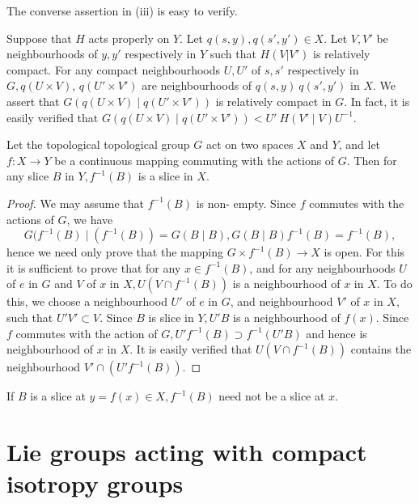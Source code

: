 The converse assertion in  (iii) is easy to  verify. 

\medskip
{}
  Suppose that  $ H $  acts properly on $ Y $. Let $ q ( s,y ), q (
  s',y' ) \in  X $. Let $ V, V' $ be neighbourhoods of  $ y,y'$
  respectively  in $ Y$ such that  $H(V|V')$  is relatively
  compact. For any compact neighbourhoods $U, U'$ of $s,s' $ respectively in $
  G,  q ( U \times V)$, $q( U'\times V' ) $  are  neighbourhoods of $
  q ( s,y)  ~ q( s', y')   $ in  $X$. We assert that  $ G ( q ( U \times
  V )  \mid q ( U' \times V' )) $ is relatively  compact in $ G $. In
  fact, it is easily verified that $ G ( q ( U \times V ) \mid  q ( U'
  \times V' ))  <  U'  ~ H ( V' \mid V ) U^{-1} $. 

\begin{lem}\label{chap2:lem2}%
  Let the topological topological group $G$  act  on two  spaces  $X$
  and $Y$, and let $ f: X \rightarrow Y $  be a continuous mapping
  commuting with the actions  of $G$. Then for any slice  $B$ in  
$Y, f^{-1} (B)$  is a slice  in  $X$.  
\end{lem}
  
\begin{proof}
  We may assume that  $f^{-1} (B)$ is non- empty. Since  $f$
  commutes with the actions of $ G $, we have  
  $$
  G ( f^{-1} (B) \mid ( f^{-1} (B))  =  G ( B \mid B ), G ( B \mid B ) 
  f^{-1} (B)= f^{-1} (B), 
  $$
  hence  we need  only prove  that the mapping $ G \times  f^{-1} (B)
  \rightarrow  X $  is  open. For this it is sufficient to prove that
  for  any $ x \in  f^{-1} (B) $, and for  any neighbourhoods $U$ of $e$
  in  $G$ and  $V$ of  $x$ in $ X, U ( V \cap f^{-1}  ( B)) $ is a
  neighbourhood of  $x$ in $X$. To do this, we  choose a neighbourhood
  $U'$ of $e$ in $G$, and neighbourhood $V'$ of $x$ in $X$, such that $
  U'V' \subset V $. Since  $B$ is  slice  in  $ Y, U' B $ is a
  neighbourhood  of  $ f (x) $. Since\pageoriginale $f$  commutes
  with the action of 
  $G, U' f^{-1} (B) \supset  f^{-1} (U' B)$  and  hence is
  neighbourhood of $x$ in $X$. It is easily verified that $U(V \cap
  f^{-1} (B))$ contains the neighbourhood $V'\cap(U' f^{-1} (B))$. 
\end{proof} 

\begin{remark*}
  If $B$ is  a slice at  $y =  f (x) \in X, f^{-1}  (B)  $ need  not
  be a  slice at $x$. 
\end{remark*} 

\section{Lie groups acting with compact isotropy groups}\label{chap2:sec3}%

